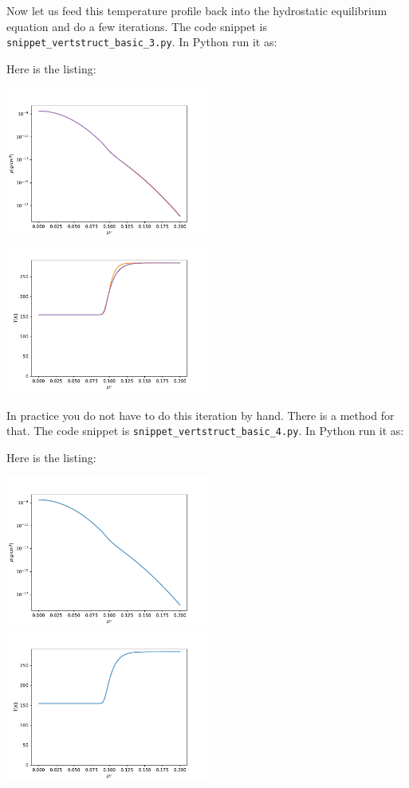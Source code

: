 \documentclass{book}
\newcommand{\code}[1]{{\small\tt #1}}
\begin{document}
Now let us feed this temperature profile back into the hydrostatic equilibrium equation and
do a few iterations. The code snippet is
\code{snippet\_vertstruct\_basic\_3.py}. In Python run it as:
\begin{codebox}
\end{codebox}
Here is the listing:

\centerline{\includegraphics[width=0.5\textwidth]{../snippets/fig_snippet_vertstruct_basic_3_1.pdf}
  \includegraphics[width=0.5\textwidth]{../snippets/fig_snippet_vertstruct_basic_3_2.pdf}}

In practice you do not have to do this iteration by hand. There is a method for that.
The code snippet is
\code{snippet\_vertstruct\_basic\_4.py}. In Python run it as:
\begin{codebox}
\end{codebox}
Here is the listing:

\centerline{\includegraphics[width=0.5\textwidth]{../snippets/fig_snippet_vertstruct_basic_4_1.pdf}
  \includegraphics[width=0.5\textwidth]{../snippets/fig_snippet_vertstruct_basic_4_2.pdf}}
\end{document}
